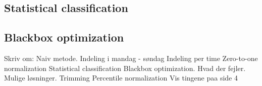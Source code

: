 \begin{table}[!ht]
\centering  %
\caption{Results from the simple classification approach} %
\label{table:naiveTrainingApproach} %
\end{table}

\subsection{Statistical classification}

\subsection{Blackbox optimization}

Skriv om:
	Naiv metode.
	Indeling i mandag - søndag
	Indeling per time
	Zero-to-one normalization
	Statistical classification
	Blackbox optimization.
	Hvad der fejler.
	Mulige løsninger.
	Trimming
	Percentile normalization
	Vis tingene paa side 4